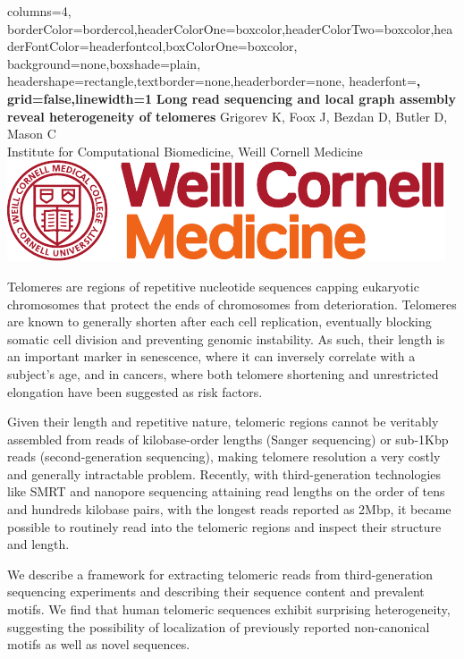 \documentclass[paperwidth=42in,paperheight=47.75in,portrait]{baposter}
\begin{document}
\begin{poster}{
    columns=4,
    borderColor=bordercol,headerColorOne=boxcolor,headerColorTwo=boxcolor,headerFontColor=headerfontcol,boxColorOne=boxcolor,
    background=none,boxshade=plain,
    headershape=rectangle,textborder=none,headerborder=none,
    headerfont=\Large\sf\bf,
    grid=false,linewidth=1
}
{}{\sf\bf Long read sequencing and local graph assembly \\ reveal heterogeneity of telomeres} {
    \vspace{.4em} Grigorev K, Foox J, Bezdan D, Butler D, Mason C \\
    {\small Institute for Computational Biomedicine, Weill Cornell Medicine}
}
{\includegraphics[scale=1.7]{logo.pdf}}


{\small
    Telomeres are regions of repetitive nucleotide sequences capping eukaryotic chromosomes that protect the ends of chromosomes from deterioration.
    Telomeres are known to generally shorten after each cell replication, eventually blocking somatic cell division and preventing genomic instability.
    As such, their length is an important marker in senescence, where it can inversely correlate with a subject’s age, and in cancers, where both
    telomere shortening and unrestricted elongation have been suggested as risk factors.

    Given their length and repetitive nature, telomeric regions cannot be veritably assembled from reads of kilobase-order lengths (Sanger sequencing)
    or sub-1Kbp reads (second-generation sequencing), making telomere resolution a very costly and generally intractable problem.
    Recently, with third-generation technologies like SMRT and nanopore sequencing attaining read lengths on the order of tens and hundreds kilobase
    pairs, with the longest reads reported as 2Mbp, it became possible to routinely read into the telomeric regions and inspect their structure
    and length.

    We describe a framework for extracting telomeric reads from third-generation sequencing experiments and describing their sequence content and
    prevalent motifs. We find that human telomeric sequences exhibit surprising heterogeneity, suggesting the possibility of localization of previously
    reported non-canonical motifs as well as novel sequences.

}
\end{poster}
\end{document}
